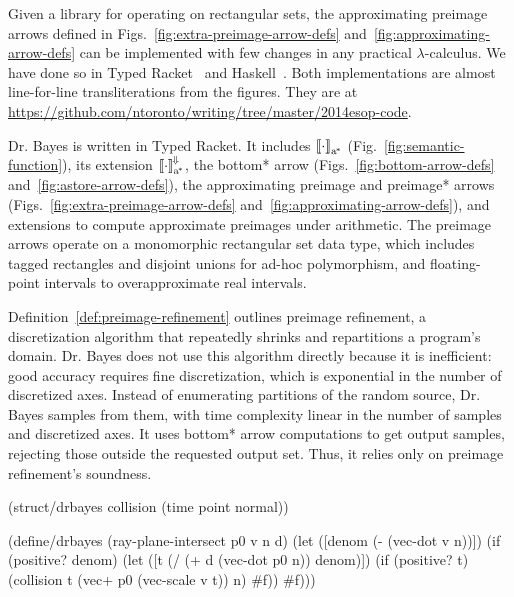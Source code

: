 \documentclass{llncs}
\newcommand{\figref}[1]{Fig.~\ref{#1}}
\newcommand{\figsref}[1]{Figs.~\ref{#1}}
\newcommand{\conv}{^{\mspace{-2mu}\Downarrow\mspace{-2mu}}}
\newcommand{\genc}{_\mathrm{a^{\mspace{-2mu}*}}}
\begin{document}
Given a library for operating on rectangular sets, the approximating preimage arrows defined in \figsref{fig:extra-preimage-arrow-defs} and~\ref{fig:approximating-arrow-defs} can be implemented with few changes in any practical $\lambda$-calculus.
We have done so in Typed Racket~\cite{cit:tobin-hochstadt-2008popl-typed-scheme} and Haskell~\cite{cit:haskell-lang}.
Both implementations are almost line-for-line transliterations from the figures.
They are at \url{https://github.com/ntoronto/writing/tree/master/2014esop-code}.

Dr. Bayes is written in Typed Racket.
It includes $\meaningof{\cdot}\genc$ (\figref{fig:semantic-function}), its extension $\meaningof{\cdot}\genc\conv$, the bottom* arrow (\figsref{fig:bottom-arrow-defs} and~\ref{fig:astore-arrow-defs}), the approximating preimage and preimage* arrows (\figsref{fig:extra-preimage-arrow-defs} and~\ref{fig:approximating-arrow-defs}), and extensions to compute approximate preimages under arithmetic.
The preimage arrows operate on a monomorphic rectangular set data type, which includes tagged rectangles and disjoint unions for ad-hoc polymorphism, and floating-point intervals to overapproximate real intervals.

Definition~\ref{def:preimage-refinement} outlines preimage refinement, a discretization algorithm that repeatedly shrinks and repartitions a program's domain.
Dr. Bayes does not use this algorithm directly because it is inefficient: good accuracy requires fine discretization, which is exponential in the number of discretized axes.
Instead of enumerating partitions of the random source, Dr. Bayes samples from them, with time complexity linear in the number of samples and discretized axes.
It uses bottom* arrow computations to get output samples, rejecting those outside the requested output set.
Thus, it relies only on preimage refinement's soundness.

\begin{lrbox}{\codebox}
\begin{varwidth}{\textwidth}
\begin{schemedisplay}
(struct/drbayes collision (time point normal))

(define/drbayes (ray-plane-intersect p0 v n d)
  (let ([denom  (- (vec-dot v n))])
    (if (positive? denom)
        (let ([t  (/ (+ d (vec-dot p0 n)) denom)])
          (if (positive? t) (collision t (vec+ p0 (vec-scale v t)) n) #f))
        #f)))
\end{schemedisplay}
\end{varwidth}
\end{lrbox}
\end{document}
